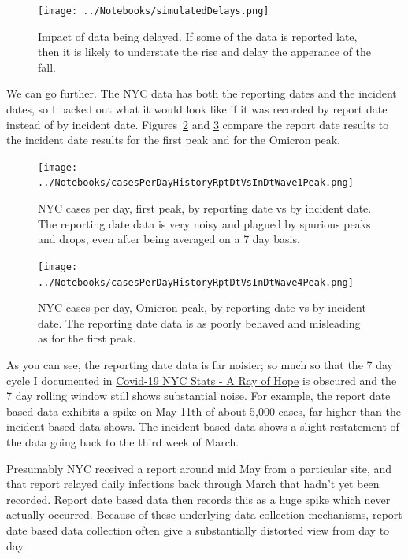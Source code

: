 \documentclass[10pt,reqno]{amsart}
\begin{document}
\begin{figure}[!htb]
  \centering
  \texttt{[image: ../Notebooks/simulatedDelays.png]}
  \caption{Impact of data being delayed.  If some of the data is
    reported late, then it is likely to understate the rise and
    delay the apperance of the fall.}
  \label{fig:sim}
\end{figure}

We can go further.  The NYC data has both the reporting dates
and the incident dates, so I backed out what it would look like if it
was recorded by report date instead of by incident
date. Figures~\ref{fig:peak1} and \ref{fig:omicron} compare the
report date results to the incident date results for the first peak
and for the Omicron peak.

\begin{figure}[!htb]
  \centering
  \texttt{[image: ../Notebooks/casesPerDayHistoryRptDtVsInDtWave1Peak.png]}
  \caption{NYC cases per day, first peak, by reporting date vs by
    incident date.  The reporting date data is very noisy and plagued
    by spurious peaks and drops, even after being averaged on a 7 day
    basis.}
  \label{fig:peak1}
\end{figure}

\begin{figure}[!htb]
  \centering
  \texttt{[image: ../Notebooks/casesPerDayHistoryRptDtVsInDtWave4Peak.png]}
  \caption{NYC cases per day, Omicron peak, by reporting date vs by
    incident date.  The reporting date data is as poorly behaved and
    misleading as for the first peak.}
  \label{fig:omicron}
\end{figure}

As you can see, the reporting date data is far noisier; so much so
that the 7 day cycle I documented in
\href{https://hjstein.blogspot.com/2020/04/covid-19-nyc-stats-ray-of-hope.html}{Covid-19
  NYC Stats - A Ray of Hope} is obscured and the 7 day rolling window
still shows substantial noise.  For example, the report date based
data exhibits a spike on May 11th of about 5,000 cases, far higher than
the incident based data shows.  The incident based data shows a slight
restatement of the data going back to the third week of March.

Presumably NYC received a report around mid May from a particular
site, and that report relayed daily infections back through March that
hadn't yet been recorded.  Report date based data then records this as
a huge spike which never actually occurred.  Because of these
underlying data collection mechanisms, report date based data
collection often give a substantially distorted view from day to day.
\end{document}
